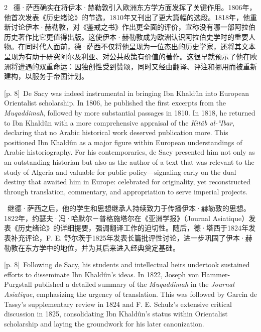 \documentclass[10pt,a4paper]{article}
\begin{document}
\begin{paracol}{2}
\switchcolumn*
{\scriptsize\color{gray} [p. 8]}\ 德·萨西确实在将伊本·赫勒敦引入欧洲东方学方面发挥了关键作用。1806年，他首次发表《历史绪论》的节选，1810年又刊出了更大篇幅的选段。1818年，他重新讨论伊本·赫勒敦，对《鉴戒之书》作出更全面的评价，宣称没有哪一部阿拉伯历史著作比它更值得出版。这使伊本·赫勒敦成为欧洲认识阿拉伯史学时的重要人物。在同时代人面前，德·萨西不仅将他呈现为一位杰出的历史学家，还将其文本呈现为有助于研究阿尔及利亚、对公共政策有价值的著作。这很早就预示了他在欧洲将遭遇的双重命运：因独创性受到赞颂，同时又经由翻译、评注和挪用而被重新建构，以服务于帝国计划。\par
\switchcolumn
{\scriptsize\color{gray} [p. 8]}\ De Sacy was indeed instrumental in bringing Ibn Khaldûn into European Orientalist scholarship. In 1806, he published the first excerpts from the \textit{Muqaddimah}, followed by more substantial passages in 1810. In 1818, he returned to Ibn Khaldûn with a more comprehensive appraisal of the \textit{Kitâb al-ʿIbar}, declaring that no Arabic historical work deserved publication more. This positioned Ibn Khaldûn as a major figure within European understandings of Arabic historiography. For his contemporaries, de Sacy presented him not only as an outstanding historian but also as the author of a text that was relevant to the study of Algeria and valuable for public policy—signaling early on the dual destiny that awaited him in Europe: celebrated for originality, yet reconstructed through translation, commentary, and appropriation to serve imperial projects.\par
\switchcolumn*
{\scriptsize\color{gray} [p. 8]}\ 继德·萨西之后，他的学生和思想继承人持续致力于传播伊本·赫勒敦的思想。1822年，约瑟夫·冯·哈默尔－普格施塔尔在《亚洲学报》（Journal Asiatique）发表《历史绪论》的详细提要，强调翻译工作的迫切性。随后，德·塔西于1824年发表补充评论，F. E. 舒尔茨于1825年发表长篇批评性讨论，进一步巩固了伊本·赫勒敦在东方学中的地位，并为其后来进入经典奠定基础。\par
\switchcolumn
{\scriptsize\color{gray} [p. 8]}\ Following de Sacy, his students and intellectual heirs undertook sustained efforts to disseminate Ibn Khaldûn’s ideas. In 1822, Joseph von Hammer-Purgstall published a detailed summary of the \textit{Muqaddimah} in the \textit{Journal Asiatique}, emphasizing the urgency of translation. This was followed by Garcin de Tassy’s supplementary review in 1824 and F. E. Schulz’s extensive critical discussion in 1825, consolidating Ibn Khaldûn’s status within Orientalist scholarship and laying the groundwork for his later canonization.\par

\end{paracol}
\end{document}
